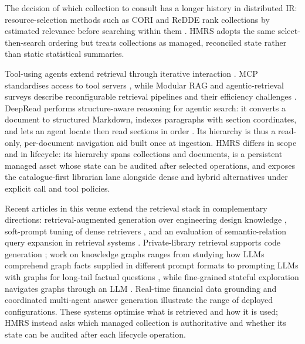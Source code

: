 The decision of which collection to consult has a longer history in
distributed IR: resource-selection methods such as CORI and ReDDE rank
collections by estimated relevance before searching within them
\citep{callan1995searching,si2003redde}. HMRS adopts the same
select-then-search ordering but treats collections as managed, reconciled
state rather than static statistical summaries.

Tool-using agents extend retrieval through iterative interaction
\citep{react-yao,toolformer}. MCP standardises access to tool servers
\citep{mcp}, while Modular RAG and agentic-retrieval surveys describe
reconfigurable retrieval pipelines and their efficiency challenges
\citep{modular-rag,singh-agentic-rag}. DeepRead performs structure-aware
reasoning for agentic search: it converts a document to structured Markdown,
indexes paragraphs with section coordinates, and lets an agent locate then
read sections in order \citep{deepread}. Its hierarchy is thus a read-only,
per-document navigation aid built once at ingestion. HMRS differs in scope
and in lifecycle: its hierarchy spans collections and documents, is a
persistent managed asset whose state can be audited after selected operations, and exposes the
catalogue-first librarian lane alongside dense and hybrid alternatives under
explicit call and tool policies.

Recent articles in this venue extend the retrieval stack in complementary
directions: retrieval-augmented generation over engineering design knowledge
\citep{siddharth2024retrieval}, soft-prompt tuning of dense retrievers
\citep{peng2024soft}, and an evaluation of semantic-relation query expansion
in retrieval systems \citep{massai2023evaluatio}. Private-library retrieval
supports code generation \citep{zan2025private}; work on knowledge graphs
ranges from studying how LLMs comprehend graph facts supplied in different
prompt formats \citep{dai2025large} to prompting LLMs with graphs for
long-tail factual questions \citep{huang2025prompting}, while fine-grained
stateful exploration navigates graphs through an LLM \citep{tao2025fine}.
Real-time financial data grounding \citep{sinha2026finbloom} and coordinated
multi-agent answer generation \citep{saadaoui2025coordinat} illustrate the
range of deployed configurations. These systems optimise what is retrieved
and how it is used; HMRS instead asks which managed collection is
authoritative and whether its state can be audited after each lifecycle
operation.

